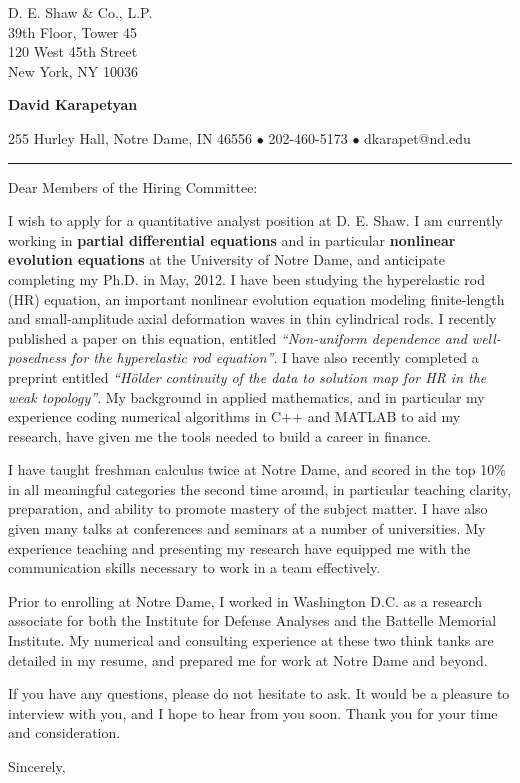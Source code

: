 \documentclass[12pt]{letter}
\date{\vspace{0.5cm}\flushleft \today}
\begin{document}
\begin{letter}{D. E. Shaw \& Co., L.P. \\
39th Floor, Tower 45 \\
120 West 45th Street \\
New York, NY 10036
}
    \begin{center}
{\bf {\Large David Karapetyan}}
\end{center}

\begin{center}
{255 Hurley Hall, Notre Dame, IN 46556  $\bullet$
202-460-5173 $\bullet$ dkarapet@nd.edu
}
\end{center}
\hrule

\opening{Dear Members of the Hiring Committee:\\}
%
%
I wish to apply for a quantitative analyst position at D. E. Shaw. I am
currently working in \textbf{partial differential equations} and in particular
\textbf{nonlinear evolution equations} at the University of Notre Dame, and 
anticipate completing my Ph.D. in May, 2012. I have been studying the
hyperelastic rod (HR) equation, an important nonlinear evolution equation
modeling finite-length and small-amplitude axial deformation waves in thin
cylindrical rods. I recently published a paper on this equation, entitled {\it
``Non-uniform dependence and well-posedness for the hyperelastic rod
equation''}. I have also recently completed a preprint entitled {\it ``H\"older
continuity of the data to solution map for HR in the weak topology''}. My
background in applied mathematics, and in particular my experience coding
numerical algorithms in C++ and MATLAB to aid my research, have given me the
tools needed to build a career in finance.

I have taught freshman calculus twice at Notre Dame, and scored in the top 10\%
in all meaningful categories the second time around, in particular teaching
clarity, preparation, and ability to promote mastery of the subject matter. I
have also given many talks at conferences and seminars at a number of
universities. My experience teaching and presenting my research have equipped
me with the communication skills necessary to work in a team effectively. 

Prior to enrolling at Notre Dame, I worked in Washington D.C. as a research
associate for both the Institute for Defense Analyses and the Battelle Memorial
Institute. My numerical and consulting experience at these two think tanks are
detailed in my resume, and prepared me for work at Notre Dame and beyond. 

If you have any questions, please do not hesitate to ask. It would be a
pleasure to interview with you, and I hope to hear from you soon. Thank you for
your time and consideration. 

\closing{Sincerely,}


\end{letter}
\end{document}
